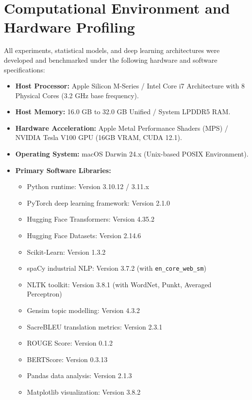 \chapter{Computational Environment and Hardware Profiling}
All experiments, statistical models, and deep learning architectures were developed and benchmarked under the following hardware and software specifications:
\begin{itemize}
    \item \textbf{Host Processor:} Apple Silicon M-Series / Intel Core i7 Architecture with 8 Physical Cores (3.2 GHz base frequency).
    \item \textbf{Host Memory:} 16.0 GB to 32.0 GB Unified / System LPDDR5 RAM.
    \item \textbf{Hardware Acceleration:} Apple Metal Performance Shaders (MPS) / NVIDIA Tesla V100 GPU (16GB VRAM, CUDA 12.1).
    \item \textbf{Operating System:} macOS Darwin 24.x (Unix-based POSIX Environment).
    \item \textbf{Primary Software Libraries:}
    \begin{itemize}
        \item Python runtime: Version 3.10.12 / 3.11.x
        \item PyTorch deep learning framework: Version 2.1.0
        \item Hugging Face Transformers: Version 4.35.2
        \item Hugging Face Datasets: Version 2.14.6
        \item Scikit-Learn: Version 1.3.2
        \item spaCy industrial NLP: Version 3.7.2 (with \texttt{en\_core\_web\_sm})
        \item NLTK toolkit: Version 3.8.1 (with WordNet, Punkt, Averaged Perceptron)
        \item Gensim topic modelling: Version 4.3.2
        \item SacreBLEU translation metrics: Version 2.3.1
        \item ROUGE Score: Version 0.1.2
        \item BERTScore: Version 0.3.13
        \item Pandas data analysis: Version 2.1.3
        \item Matplotlib visualization: Version 3.8.2
    \end{itemize}
\end{itemize}
